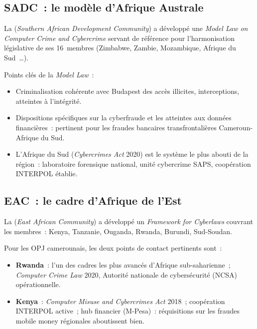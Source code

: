 \subsection{SADC~: le modèle d'Afrique Australe}

La  (\textit{Southern African Development
Community}) a développé une \textit{Model Law on Computer Crime and
Cybercrime} servant de référence pour l'harmonisation législative de ses
16~membres (Zimbabwe, Zambie, Mozambique, Afrique du Sud~\ldots).

Points clés de la \textit{Model Law}~:
\begin{itemize}
    \item Criminalisation cohérente avec Budapest des accès illicites,
          interceptions, atteintes à l'intégrité.
    \item Dispositions spécifiques sur la cyberfraude et les atteintes
          aux données financières~: pertinent pour les fraudes bancaires
          transfrontalières Cameroun-Afrique du Sud.
    \item L'Afrique du Sud (\textit{Cybercrimes Act} 2020) est le système
          le plus abouti de la région~: laboratoire forensique national,
          unité cybercrime SAPS, coopération INTERPOL établie.
\end{itemize}

\subsection{EAC~: le cadre d'Afrique de l'Est}

La  (\textit{East African Community}) a développé
un \textit{Framework for Cyberlaws} couvrant les membres~: Kenya, Tanzanie,
Ouganda, Rwanda, Burundi, Sud-Soudan.

Pour les OPJ camerounais, les deux points de contact pertinents sont~:
\begin{itemize}
    \item \textbf{Rwanda}~: l'un des cadres les plus avancés d'Afrique
          sub-saharienne~; \textit{Computer Crime Law} 2020, Autorité
          nationale de cybersécurité (NCSA) opérationnelle.
    \item \textbf{Kenya}~: \textit{Computer Misuse and Cybercrimes Act}
          2018~; coopération INTERPOL active~; hub financier
          (M-Pesa)~: réquisitions sur les fraudes mobile money
          régionales aboutissent bien.
\end{itemize}

